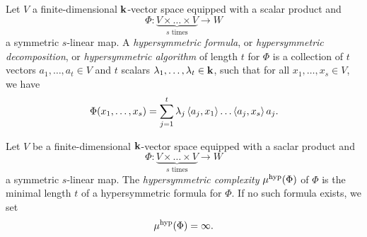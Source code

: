 \begin{defi}
Let $V$ a finite-dimensional $\mathbf{k}$-vector
space equipped with a scalar product and
\[
  \Phi:\underset{\textrm{$s$ times}}{\underbrace{V\times\dots\times V}}\to W
\]
a symmetric $s$-linear map. A \emph{hypersymmetric formula}, or
\emph{hypersymmetric decomposition}, or \emph{hypersymmetric algorithm} of length $t$ for $\Phi$ is a
collection of $t$ vectors $a_1, \dots, a_t\in V$ and $t$ scalars $\lambda_1,
\dots, \lambda_t\in\mathbf{k}$, such that for all $x_1, \dots, x_s\in
V$, we have
\[
  \Phi(x_1, \dots, x_s) =
  \sum_{j=1}^t\lambda_j\left\langle a_j,x_1\right\rangle\dots\left\langle a_j,x_s\right\rangle a_j.
\]
\end{defi}
\begin{defi}
Let $V$ be a finite-dimensional $\mathbf{k}$-vector space equipped with a saclar product
and
\[
  \Phi:\underset{\textrm{$s$ times}}{\underbrace{V\times\dots\times V}}\to W
\]
a symmetric $s$-linear map. The \emph{hypersymmetric complexity} $\mu^{\textrm{hyp}}(\Phi)$ of $\Phi$ is the
minimal length $t$ of a hypersymmetric formula for $\Phi$. If no such
formula exists, we set
\[
  \mu^{\textrm{hyp}}(\Phi) = \infty.
\]
\end{defi}
